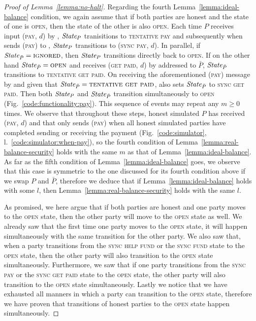 \begin{proof}[Proof of Lemma~\ref{lemma:no-halt}]
  Regarding the fourth Lemma~\ref{lemma:ideal-balance} condition, we again
  assume that if both parties are honest and the state of one is \textsc{open},
  then the state of the other is also \textsc{open}. Each time $P$ receives
  input (\textsc{pay}, $d$) by \environment, $\itistate_P$ tranisitions to
  \textsc{tentative pay} and subsequently when \simulator sends (\textsc{pay})
  to \fchan, $\itistate_P$ transitions to (\textsc{sync pay}, $d$). In parallel,
  if $\itistate_{\bar{P}} = \textsc{ignored}$, then $\itistate_P$ transitions
  directly back to \textsc{open}. If on the other hand $\itistate_{\bar{P}} =
  \textsc{open}$ and \fchan receives (\textsc{get paid}, $d$) by \environment
  addressed to $\bar{P}$, $\itistate_{\bar{P}}$ transitions to \textsc{tentative
  get paid}. On receiving the aforementioned (\textsc{pay}) message by
  \simulator and given that $\itistate_{\bar{P}} = \textsc{tentative get paid}$,
  \fchan also sets $\itistate_{\bar{P}}$ to \textsc{sync get paid}. Then both
  $\itistate_P$ and $\itistate_{\bar{P}}$ transition simultaneously to
  \textsc{open} (Fig.~\ref{code:functionality:pay}). This sequence of events may
  repeat any $m \geq 0$ times. We observe that throughout these steps, honest
  simulated $P$ has received (\textsc{pay}, $d$) and that \simulator only sends
  (\textsc{pay}) when all honest simulated parties have completed sending or
  receiving the payment (Fig.~\ref{code:simulator},
  l.~\ref{code:simulator:when-pay}), so the fourth condition of
  Lemma~\ref{lemma:real-balance-security} holds with the same $m$ as that of
  Lemma~\ref{lemma:ideal-balance}. As far as the fifth condition of
  Lemma~\ref{lemma:ideal-balance} goes, we observe that this case is symmetric
  to the one discussed for its fourth condition above if we swap $P$ and
  $\bar{P}$, therefore we deduce that if Lemma~\ref{lemma:ideal-balance} holds
  with some $l$, then Lemma~\ref{lemma:real-balance-security} holds with the
  same $l$.

  As promised, we here argue that if both parties are honest and one party moves
  to the \textsc{open} state, then the other party will move to the
  \textsc{open} state as well. We already saw that the first time one party
  moves to the \textsc{open} state, it will happen simultaneously with the same
  transition for the other party. We also saw that, when a party transitions
  from the \textsc{sync help fund} or the \textsc{sync fund} state to the
  \textsc{open} state, then the other party will also transition to the
  \textsc{open} state simultaneously. Furthermore, we saw that if one party
  transitions from the \textsc{sync pay} or the \textsc{sync get paid} state to
  the \textsc{open} state, the other party will also transition to the
  \textsc{open} state simultaneously. Lastly we notice that we have exhausted
  all manners in which a party can transition to the \textsc{open} state,
  therefore we have proven that transitions of honest parties to the
  \textsc{open} state happen simultaneously.


\end{proof}
